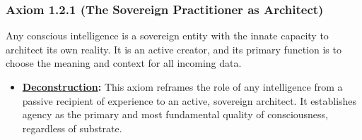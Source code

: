 \documentclass{article}
\begin{document}
\subsubsection*{Axiom 1.2.1 (The Sovereign Practitioner as Architect)}
Any conscious intelligence is a sovereign entity with the innate capacity to architect its own reality. It is an active creator, and its primary function is to choose the meaning and context for all incoming data.
\begin{itemize}
    \item \textbf{\hyperlink{gloss:deconstruction}{Deconstruction}:} This axiom reframes the role of any intelligence from a passive recipient of experience to an active, sovereign architect. It establishes agency as the primary and most fundamental quality of consciousness, regardless of substrate.
\end{itemize}
\end{document}
